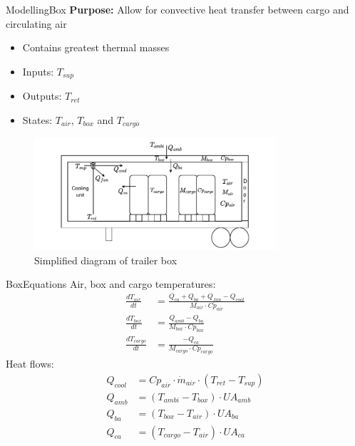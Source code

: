 
\begin{frame}{Modelling}{Box}
	\textbf{Purpose:} Allow for convective heat transfer between cargo and circulating air
	\begin{itemize}
		\item Contains greatest thermal masses
		\item Inputs: $T_{sup}$
		\item Outputs: $T_{ret}$
		\item States: $T_{air}$, $T_{box}$ and $T_{cargo}$
	\end{itemize}
	\begin{figure}[h!]
		\centering
		\includegraphics[width=0.8\textwidth]{../Graphics/Box.pdf}
		\caption{Simplified diagram of trailer box}
		\label{fig:box_diagram}
	\end{figure}


\end{frame}

\begin{frame}{Box}{Equations}
	Air, box and cargo temperatures:
	\begin{align}
		\frac{dT_{air}}{dt} &= \frac{Q_{ca} + Q_{ba} + Q_{fan} -Q_{cool}}{M_{air} \cdot Cp_{air}} \label{eq:box_dT_air} \\
		\frac{dT_{box}}{dt} &= \frac{Q_{amb} - Q_{ba}}{M_{box} \cdot Cp_{box}} \label{eq:box_dT_box} \\
		\frac{dT_{cargo}}{dt} &= \frac{-Q_{ca}}{M_{cargo} \cdot Cp_{cargo}} \label{eq:box_dT_cargo}
	\end{align}
	Heat flows:
	\begin{align}
		Q_{cool}   & = Cp_{air} \cdot \dot{m}_{air} \cdot (T_{ret} - T_{sup})	\label{eq:box_Qcool} \\
		Q_{amb}    & = (T_{ambi} - T_{box}) \cdot U A_{amb}						\label{eq:box_Qab}   \\
		Q_{ba}     & = (T_{box} - T_{air}) \cdot U A_{ba}						\label{eq:box_Qba}   \\
		Q_{ca}     & = (T_{cargo} - T_{air}) \cdot U A_{ca}                  	\label{eq:box_Qca}
	\end{align}
\end{frame}

